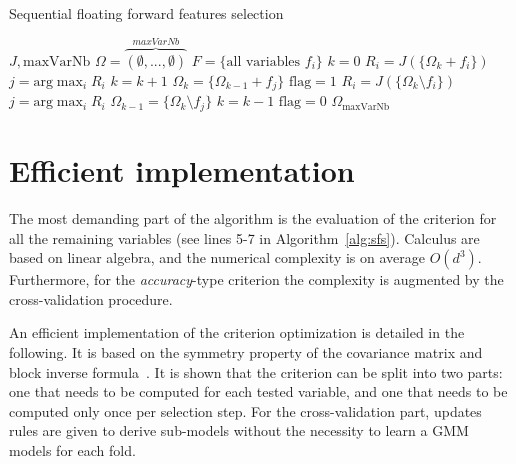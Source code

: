 \documentclass[journal,10pt]{IEEEtran}
\begin{document}
        \begin{algorithm}
        \caption{Sequential floating forward features selection\label{alg:sffs}}
        {\footnotesize
        \begin{algorithmic}[1]
        \REQUIRE $J,\text{maxVarNb}$
        \STATE $\Omega=\overbrace{(\emptyset,...,\emptyset)}^{maxVarNb}$
        \STATE $F=\text{\{all variables $f_i$\}}$
        \STATE $k=0$
        \STATE $R_i = J(\{\Omega_k + f_i\})$
        \ENDFOR
        \STATE $j=\text{arg} \max_{i} R_i$
        \STATE $k=k+1$
        \STATE $\Omega_k = \{\Omega_{k-1} + f_j\}$
        \STATE $\text{flag}=1$
        \STATE $R_i = J(\{\Omega_k \setminus f_i\})$
        \ENDFOR
        \STATE $j=\text{arg} \max_{i} R_i$
        \STATE $\Omega_{k-1} = \{\Omega_k \setminus f_j\}$
        \STATE $k=k-1$
        \ELSE
        \STATE $\text{flag}=0$
        \ENDIF
        \ENDWHILE
        \ENDIF
        \ENDWHILE
        \RETURN $\Omega_{\text{maxVarNb}}$
        \end{algorithmic}
        }
        \end{algorithm}


\section{Efficient implementation}
\label{sec:implementation}
The most  demanding part  of the  algorithm is  the evaluation  of the
criterion  for  all   the  remaining  variables  (see   lines  5-7  in
Algorithm~\ref{alg:sfs}). Calculus are based on linear algebra, and the
numerical  complexity is  on average  $O(d^3)$.  Furthermore,  for the
\emph{accuracy}-type  criterion the  complexity  is  augmented by  the
cross-validation procedure.

An efficient implementation of  the criterion optimization is detailed
in  the following.   It  is  based on  the  symmetry  property of  the
covariance matrix  and block inverse  formula~\cite{IMM2012-03274}.  It is shown  that the criterion  can be split  into two
parts: one that needs to be computed for each tested variable, and one
that  needs to  be  computed only  once per  selection  step. For  the
cross-validation part,  updates rules  are given to  derive sub-models
without the necessity to learn a GMM models for each fold.
\end{document}
